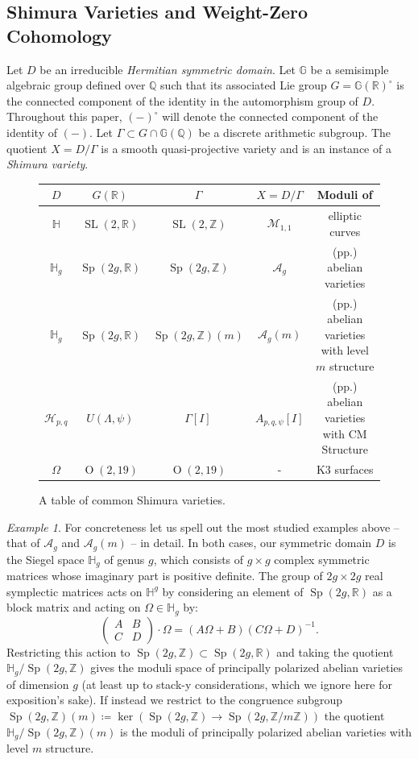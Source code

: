\documentclass[11pt,reqno]{amsart}
\theoremstyle{remark}
\newtheorem{example}[lemma]{Example}
\newcommand{\GG}{\mathbb{G}}
\newcommand{\HH}{\mathbb{H}}
\newcommand{\QQ}{\mathbb{Q}}
\newcommand{\RR}{\mathbb{R}}
\newcommand{\ZZ}{\mathbb{Z}}
\DeclareMathOperator{\OO}{O}
\DeclareMathOperator{\SL}{SL}
\DeclareMathOperator{\Sp}{Sp}
\begin{document}
\subsection{Shimura Varieties and Weight-Zero Cohomology}

Let $D$ be an irreducible \emph{Hermitian symmetric domain}. Let $\GG$ be a semisimple algebraic group defined over $\QQ$ such that its associated Lie group $G=\GG(\RR)^{\circ}$ is the connected component of the identity in the automorphism group of $D$. Throughout this paper, $(-)^\circ$ will denote the connected component of the identity of $(-)$. Let $\Gamma \subset G \cap \GG(\QQ)$ be a discrete arithmetic subgroup. The quotient $X = D / \Gamma$ is a smooth quasi-projective variety and is an instance of a \emph{Shimura variety}. 

\begin{figure}[H]
\begin{tabular}{| c | c | c | c | c |} \hline
$D$ & $G(\RR)$ & $\Gamma$ & $X=D/\Gamma$ &Moduli of\\ \hline\hline
$\HH$ & $\SL(2,\RR)$ & $\SL(2,\ZZ)$ & $\mathcal{M}_{1,1}$ & elliptic curves \\ \hline
$\HH_{g}$ & $\Sp(2g,\RR)$ & $\Sp(2g, \ZZ)$ & $\mathcal{A}_{g}$ & (pp.) abelian varieties \\ \hline
$\HH_{g}$ & $\Sp(2g,\RR)$ & $\Sp(2g,\ZZ)(m)$ & $\mathcal{A}_{g}(m)$ & (pp.) abelian varieties with level $m$ structure  \\ \hline
$\mathcal{H}_{p,q}$ & $U(\Lambda,\psi)$ & $\Gamma[I]$ & $A_{p,q,\psi}[I]$ & (pp.) abelian varieties with CM Structure\\ \hline
$\Omega$ & $\OO(2,19)$ & $\OO(2,19)$ & - & K3 surfaces \\ \hline
\end{tabular}
\caption{A table of common Shimura varieties.}
\end{figure}

\begin{example}\label{ex:ag}
For concreteness let us spell out the most studied examples above -- that of $\mathcal{A}_{g}$ and $\mathcal{A}_{g}(m)$ -- in detail. In both cases, our symmetric domain $D$ is the Siegel space $\HH_{g}$ of genus $g$, which consists of $g\times g$ complex symmetric matrices whose imaginary part is positive definite. The group of $2g\times 2g$ real symplectic matrices acts on $\HH^{g}$ by considering an element of $\Sp(2g,\RR)$ as a block matrix and acting on $\Omega \in \HH_{g}$ by:
\[
\begin{pmatrix} A & B \\
C & D
\end{pmatrix} \cdot \Omega = (A\Omega+B)(C\Omega+D)^{-1}.
\] 
Restricting this action to $\Sp(2g,\ZZ)\subset \Sp(2g,\RR)$ and taking the quotient $\HH_{g}/\Sp(2g,\ZZ)$ gives the moduli space of principally polarized abelian varieties of dimension $g$ (at least up to stack-y considerations, which we ignore here for exposition's sake). If instead we restrict to the congruence subgroup $\Sp(2g,\ZZ)(m)\coloneqq \ker(\Sp(2g,\ZZ)\to \Sp(2g,\ZZ/m\ZZ))$ the quotient $\HH_{g}/\Sp(2g,\ZZ)(m)$ is the moduli of principally polarized abelian varieties with level $m$ structure. 
\end{example}
\end{document}
